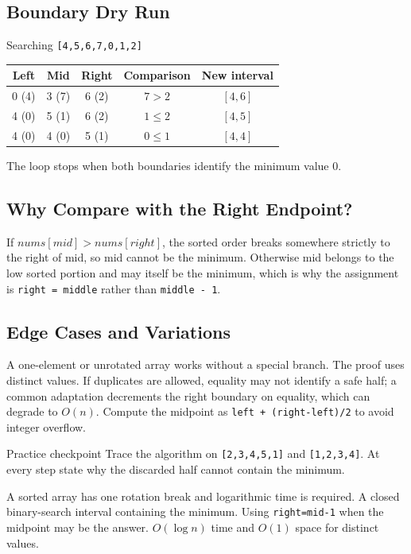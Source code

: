 \subsection{Boundary Dry Run}
\begin{dryrunbox}{Searching \texttt{[4,5,6,7,0,1,2]}}
\begin{center}
\begin{tabular}{@{}c c c c c@{}}
\toprule
Left & Mid & Right & Comparison & New interval \\
\midrule
0 (4) & 3 (7) & 6 (2) & \(7>2\) & \([4,6]\) \\
4 (0) & 5 (1) & 6 (2) & \(1\le2\) & \([4,5]\) \\
4 (0) & 4 (0) & 5 (1) & \(0\le1\) & \([4,4]\) \\
\bottomrule
\end{tabular}
\end{center}
The loop stops when both boundaries identify the minimum value 0.
\end{dryrunbox}

\subsection{Why Compare with the Right Endpoint?}
If \(nums[mid]>nums[right]\), the sorted order breaks somewhere strictly to
the right of mid, so mid cannot be the minimum. Otherwise mid belongs to the
low sorted portion and may itself be the minimum, which is why the assignment
is \texttt{right = middle} rather than \texttt{middle - 1}.

\subsection{Edge Cases and Variations}
A one-element or unrotated array works without a special branch. The proof
uses distinct values. If duplicates are allowed, equality may not identify a
safe half; a common adaptation decrements the right boundary on equality,
which can degrade to \(O(n)\). Compute the midpoint as
\texttt{left + (right-left)/2} to avoid integer overflow.

\begin{revisionbox}{Practice checkpoint}
Trace the algorithm on \texttt{[2,3,4,5,1]} and \texttt{[1,2,3,4]}. At every
step state why the discarded half cannot contain the minimum.
\end{revisionbox}
\chaptercheckpoint
  {A sorted array has one rotation break and logarithmic time is required.}
  {A closed binary-search interval containing the minimum.}
  {Using \texttt{right=mid-1} when the midpoint may be the answer.}
  {$O(\log n)$ time and $O(1)$ space for distinct values.}
\judgeclassnote


